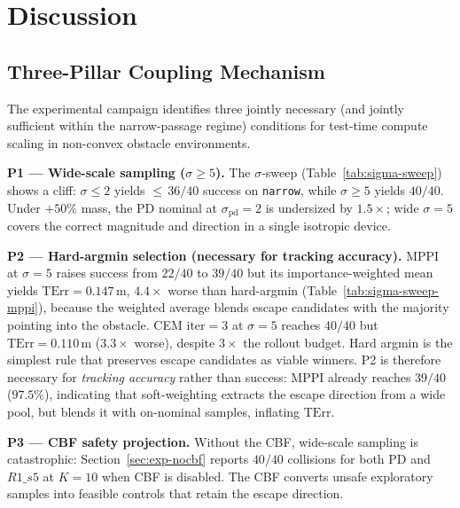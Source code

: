 \documentclass[11pt,onecolumn,a4paper]{article}
\newcommand{\pd}{\mathrm{pd}}
\newcommand{\TErr}{\mathrm{TErr}}
\begin{document}
\section{Discussion}\label{sec:discussion}

\subsection{Three-Pillar Coupling Mechanism}\label{sec:disc-mechanism}

The experimental campaign identifies three jointly necessary (and jointly
sufficient within the narrow-passage regime) conditions
for test-time compute scaling in non-convex obstacle environments.

\textbf{P1 --- Wide-scale sampling ($\sigma \ge 5$).}
The $\sigma$-sweep (Table~\ref{tab:sigma-sweep}) shows a cliff:
$\sigma \le 2$ yields ${\le}\,36/40$ success on \texttt{narrow}, while
$\sigma \ge 5$ yields $40/40$.  Under $+50\%$ mass, the PD nominal at
$\sigma_\pd = 2$ is undersized by $1.5\times$; wide $\sigma = 5$ covers
the correct magnitude and direction in a single isotropic device.

\textbf{P2 --- Hard-argmin selection (necessary for tracking accuracy).}
MPPI at $\sigma = 5$ raises success from $22/40$ to $39/40$ but its
importance-weighted mean yields $\TErr = 0.147\,$m, $4.4\times$ worse
than hard-argmin (Table~\ref{tab:sigma-sweep-mppi}), because the
weighted average blends escape candidates with the majority pointing
into the obstacle.  CEM iter$=3$ at $\sigma = 5$ reaches $40/40$ but
$\TErr = 0.110\,$m ($3.3\times$ worse), despite $3\times$ the rollout
budget.  Hard argmin is the simplest rule that preserves escape
candidates as viable winners.  P2 is therefore necessary for
\emph{tracking accuracy} rather than success: MPPI already reaches
$39/40$ ($97.5\%$), indicating that soft-weighting extracts the escape
direction from a wide pool, but blends it with on-nominal samples,
inflating $\TErr$.

\textbf{P3 --- CBF safety projection.}
Without the CBF, wide-scale sampling is catastrophic:
Section~\ref{sec:exp-nocbf} reports $40/40$ collisions for both PD and
$R1\_s5$ at $K = 10$ when CBF is disabled.  The CBF converts unsafe
exploratory samples into feasible controls that retain the escape
direction.
\end{document}
